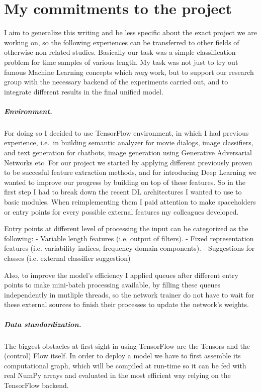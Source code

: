 \chapter{My commitments to the project}

I aim to generalize this writing and be less specific about the exact project we are working on, so the following experiences can be transferred to other fields of otherwise non related studies.
Basically our task was a simple classification problem for time samples of various length.
My task was not just to try out famous Machine Learning concepts which \textit{may} work, but to support our research group with the necessary backend of the experiments carried out, and to integrate different results in the final unified model.

\paragraph{Environment.}
For doing so I decided to use TensorFlow environment, in which I had previous experience, i.e.\ in building semantic analyzer for movie dialogs, image classifiers, and text generation for chatbots, image generation using Generative Adversarial Networks etc.
For our project we started by applying different previously proven to be succesful feature extraction methods, and for introducing Deep Learning we wanted to improve our progress by building on top of these features.
So in the first step I had to break down the recent DL architectures I wanted to use to basic modules.
When reimplementing them I paid attention to make spaceholders or entry points for every possible external features my colleagues developed.

Entry points at different level of processing the input can be categorized as the following:
- Variable length features (i.e. output of filters).
- Fixed representation features (i.e. variability indices, frequency domain components).
- Suggestions for classes (i.e. external classifier suggestion)

Also, to improve the model's efficiency I applied queues after different entry points to make mini-batch processing available, by filling these queues independently in mutliple threads, so the network trainer do not have to wait for these external sources to finish their processes to update the network's weights.

\paragraph{Data standardization.}
The biggest obstacles at first sight in using TensorFlow are the Tensors and the (control) Flow itself. In order to deploy a model we have to first assemble its computational graph, which will be compiled at run-time so it can be fed with real NumPy arrays and evaluated in the most efficient way relying on the TensorFlow backend.

